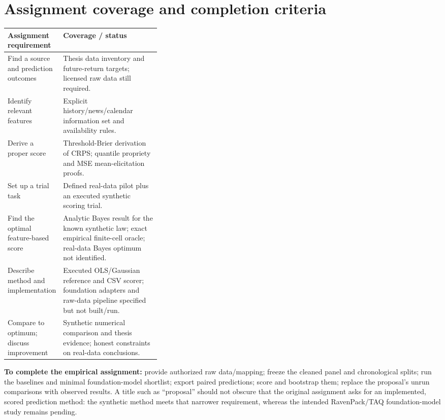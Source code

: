 \documentclass[11pt,letterpaper]{article}
\begin{document}
\section{Assignment coverage and completion criteria}
\begin{tabularx}{\linewidth}{@{}P{0.35\linewidth}Y@{}}
\toprule
Assignment requirement & Coverage / status \\
\midrule
Find a source and prediction outcomes & Thesis data inventory and future-return targets; licensed raw data still required.\\
Identify relevant features & Explicit history/news/calendar information set and availability rules.\\
Derive a proper score & Threshold-Brier derivation of CRPS; quantile propriety and MSE mean-elicitation proofs.\\
Set up a trial task & Defined real-data pilot plus an executed synthetic scoring trial.\\
Find the optimal feature-based score & Analytic Bayes result for the known synthetic law; exact empirical finite-cell oracle; real-data Bayes optimum not identified.\\
Describe method and implementation & Executed OLS/Gaussian reference and CSV scorer; foundation adapters and raw-data pipeline specified but not built/run.\\
Compare to optimum; discuss improvement & Synthetic numerical comparison and thesis evidence; honest constraints on real-data conclusions.\\
\bottomrule
\end{tabularx}

\textbf{To complete the empirical assignment:} provide authorized raw data/mapping; freeze the cleaned panel and chronological splits; run the baselines and minimal foundation-model shortlist; export paired predictions; score and bootstrap them; replace the proposal's unrun comparisons with observed results. A title such as ``proposal'' should not obscure that the original assignment asks for an implemented, scored prediction method: the synthetic method meets that narrower requirement, whereas the intended RavenPack/TAQ foundation-model study remains pending.
\end{document}
